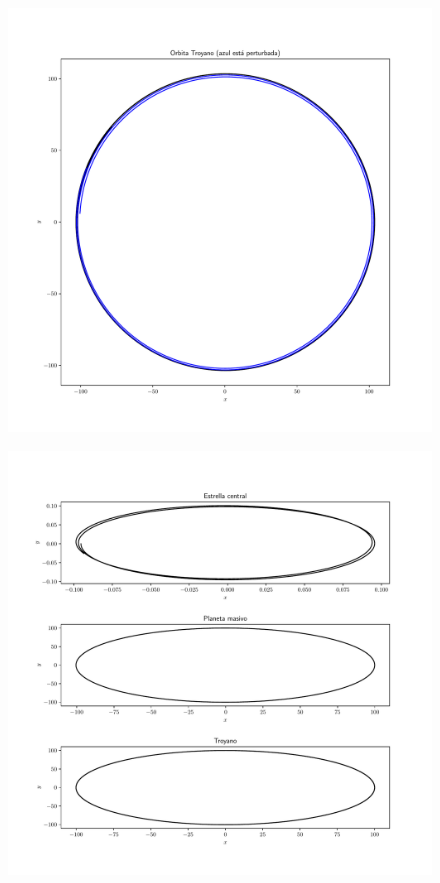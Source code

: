 \documentclass[a4paper]{article}
\begin{document}
\begin{figure}
\includegraphics[width=\textwidth]{Troyano.pdf} 
\end{figure}
\begin{figure}
\includegraphics[width=\textwidth]{OrbitsPLOT.pdf}
\end{figure}
\end{document}
